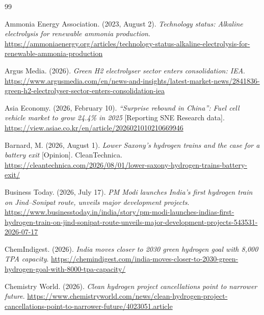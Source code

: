 \newpage
{}
{\small
\let\origsection\section\renewcommand{\section}[2]{}%
\begin{thebibliography}{99}\setlength{\itemsep}{3.2pt}\raggedright

 Ammonia Energy Association. (2023, August 2). \emph{Technology status: Alkaline electrolysis for renewable ammonia production}. \url{https://ammoniaenergy.org/articles/technology-status-alkaline-electrolysis-for-renewable-ammonia-production}

 Argus Media. (2026). \emph{Green H2 electrolyser sector enters consolidation: IEA}. \url{https://www.argusmedia.com/en/news-and-insights/latest-market-news/2841836-green-h2-electrolyser-sector-enters-consolidation-iea}

 Asia Economy. (2026, February 10). \emph{``Surprise rebound in China'': Fuel cell vehicle market to grow 24.4\% in 2025} [Reporting SNE Research data]. \url{https://view.asiae.co.kr/en/article/2026021010210669946}

 Barnard, M. (2026, August 1). \emph{Lower Saxony's hydrogen trains and the case for a battery exit} [Opinion]. CleanTechnica. \url{https://cleantechnica.com/2026/08/01/lower-saxony-hydrogen-trains-battery-exit/}

 Business Today. (2026, July 17). \emph{PM Modi launches India's first hydrogen train on Jind–Sonipat route, unveils major development projects}. \url{https://www.businesstoday.in/india/story/pm-modi-launches-indias-first-hydrogen-train-on-jind-sonipat-route-unveils-major-development-projects-543531-2026-07-17}

 ChemIndigest. (2026). \emph{India moves closer to 2030 green hydrogen goal with 8,000 TPA capacity}. \url{https://chemindigest.com/india-moves-closer-to-2030-green-hydrogen-goal-with-8000-tpa-capacity/}

 Chemistry World. (2026). \emph{Clean hydrogen project cancellations point to narrower future}. \url{https://www.chemistryworld.com/news/clean-hydrogen-project-cancellations-point-to-narrower-future/4023051.article}


\end{thebibliography}}
